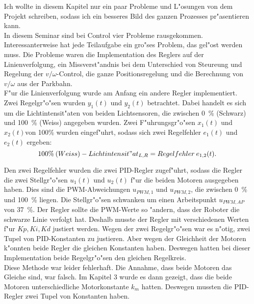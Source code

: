 Ich wollte in diesem Kapitel nur ein paar Probleme und L"osungen von dem Projekt schreiben, sodass ich ein besseres Bild des ganzen Prozesses pr"asentieren kann. \\

In diesem Seminar sind bei Control vier Probleme rausgekommen. Interessanterweise hat jede Teilaufgabe ein gro"ses Problem, das gel"ost werden muss. Die Probleme waren die Implementation des Reglers auf der Linienverfolgung, ein Missverst"andnis bei dem Unterschied von Steureung und Regelung der \(v/\omega\)-Control, die ganze Positionsregelung und die Berechnung von \(v/\omega\) aus der Parkbahn. \\

F"ur die Linienverfolgung wurde am Anfang ein andere Regler implementiert. Zwei Regelgr"o"sen wurden $y_1(t)$ und \(y_2(t)\) betrachtet. Dabei handelt es sich um die Lichtintensit"aten von beiden Lichtsensoren, die zwischen \si{0\percent} (Schwarz) und \si{100\percent} (Weiss) angegeben wurden. Zwei F"uhrungsgr"o"sen $x_1(t)$ und $x_2(t)$von 100\% wurden eingef"uhrt, sodass sich zwei Regelfehler $e_1(t)$ und $e_2(t)$ ergeben:
\begin{equation*}
    \si{100\percent} \: (Weiss) - Lichtintensit"at_{L,R} = Regelfehler \: e_{1,2}(t).
\end{equation*}

Den zwei Regelfehler wurden die zwei PID-Regler zugef"uhrt, sodass die Regler die zwei Stellgr"o"sen \(u_1(t)\) und \(u_2(t)\) f"ur die beiden Motoren ausgegeben haben. Dies sind die PWM-Abweichungen \(u_{PWM,1}\) und \(u_{PWM,2}\), die zwischen \si{0\percent} und \si{100\percent} liegen. Die Stellgr"o"sen schwanken um einen Arbeitspunkt \(u_{PWM,AP}\) von \si{37\percent}. Der Regler sollte die PWM-Werte so "andern, dass der Roboter die schwarze Linie verfolgt hat. Deshalb musste der Regler mit verschiedenen Werten f"ur \(Kp, Ki, Kd\) justiert werden. Wegen der zwei Regelgr"o"sen war es n"otig, zwei Tupel von PID-Konstanten zu justieren. Aber wegen der Gleichheit der Motoren k"onnten beide Regler die gleichen Konstanten haben. Deswegen hatten bei dieser Implementation beide Regelgr"o"sen den gleichen Regelkreis. \\

Diese Methode war leider fehlerhaft. Die Annahme, dass beide Motoren das Gleiche sind, war falsch. Im Kapitel 3 wurde es dann gezeigt, dass die beide Motoren unterschiedliche Motorkonstante \(k_m\) hatten. Deswegen mussten die PID-Regler zwei Tupel von Konstanten haben. \\

